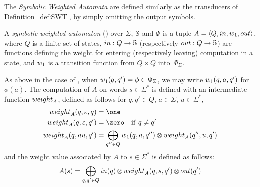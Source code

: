 \noindent
The \emph{Symbolic Weighted Automata} %
are defined similarly as the transducers of Definition~\ref{def:SWT},
by simply omitting the output symbols.
%
%
\begin{definition} \label{def:SWA}
A \emph{symbolic-weighted automaton} (\SWA)
over $\Sigma$, $\mathbb{S}$ and $\bar\Phi$
is a tuple
$A = \< Q, \init, {\wei_1}, \final >$,
where $Q$ is a finite set of states,
$\mathsf{in} : Q \to \Semiring$ %
(respectively $\mathsf{out} : Q \to \Semiring$)  %
are functions defining the weight for entering
(respectively leaving) computation in a state,
and ${\wei_1}$ is a transition function
from $Q \times Q$ into~$\Phi_{\Sigma}$.
\end{definition}
%
\noindent
{}
As above in the case of \SWT,
when $\wei_1(q, q') = \phi \in \Phi_\Sigma$,
we may write $\wei_1(q, a, q')$ for~$\phi(a)$.
The computation of $A$ on words $s \in \Sigma^*$
is defined with an intermediate function $\weight_A$,
defined as follows for $q, q' \in Q$, $a \in \Sigma$, $u \in \Sigma^*$,
%
\begin{align}
\weight_A(q, \varepsilon, q) & = \one\\ %
\weight_A(q, \varepsilon, q') & = \zero \quad \mathrm{if~} q \neq q'\nonumber\\
\weight_A(q, au, q') & =  \displaystyle\bigoplus_{q'' \in Q}
    \wei_{1}(q, a, q'') \otimes \weight_A(q'', u, q')\nonumber
\label{eq:SWA-weight}
\end{align}
%
\noindent
and the weight value associated by $A$ to
$s \in \Sigma^*$ is defined as follows: %
\begin{equation}
A(s)  =
\displaystyle\bigoplus_{q, q' \in Q} \init(q)
\mathop{\otimes} \weight_A(q, s, q') \mathop{\otimes} \final(q')
\label{eq:SWA-value}
\end{equation}


%


